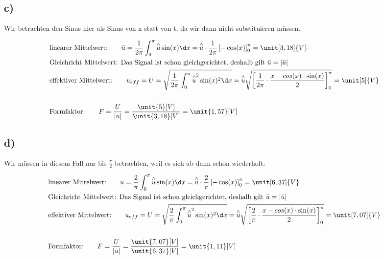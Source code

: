 \subsection*{c)}

Wir betrachten den Sinus hier als Sinus von x statt von t, da wir dann nicht substituieren müssen.

\begin{align*}
	&\text{linearer Mittelwert:} \qquad \bar{u} = \frac{1}{2 \pi} \int_0^\pi \overset{\wedge}{u} \sin(x) \d x = \overset{\wedge}{u} \cdot \frac{1}{2 \pi} \left[ - \cos(x) \right]_0^\pi = \unit[3,18]{V} \\
	&\text{Gleichricht Mittelwert: Das Signal ist schon gleichgerichtet, deshalb gilt $\bar{u} = |\bar{u}|$}  \\
	&\text{effektiver Mittelwert:} \qquad u_{eff} = U = \sqrt{ \frac{1}{2 \pi} \int_0^\pi \overset{\wedge}{u}^2\sin(x)^2 \d x} = \overset{\wedge}{u} \sqrt{\left[ \frac{1}{2 \pi} \cdot \frac{x - cos(x) \cdot \sin(x)}{2}\right]_0^\pi} = \unit[5]{V} \\
	\hfill \\
	&\text{Formfaktor:} \qquad F = \frac{U}{|u|} = \frac{\unit{5}[V]}{\unit{3,18}[V]} = \unit{1,57}[V]
\end{align*}


\newpage

\subsection*{d)}

Wir müssen in diesem Fall nur bis $\frac{\pi}{2}$ betrachten, weil es sich ab dann schon wiederholt:

\begin{align*}
	&\text{linearer Mittelwert:} \qquad \bar{u} = \frac{2}{\pi} \int_0^\pi \overset{\wedge}{u} \sin(x) \d x = \overset{\wedge}{u} \cdot \frac{2}{\pi} \left[ - \cos(x) \right]_0^\pi = \unit[6,37]{V} \\
	&\text{Gleichricht Mittelwert: Das Signal ist schon gleichgerichtet, deshalb gilt $\bar{u} = |\bar{u}|$}  \\
	&\text{effektiver Mittelwert:} \qquad u_{eff} = U = \sqrt{ \frac{2}{\pi} \int_0^\pi \overset{\wedge}{u}^2\sin(x)^2 \d x} = \overset{\wedge}{u} \sqrt{\left[ \frac{2}{\pi} \cdot \frac{x - cos(x) \cdot \sin(x)}{2}\right]_0^\pi} = \unit[7,07]{V} \\
	\hfill \\
	&\text{Formfaktor:} \qquad F = \frac{U}{|u|} = \frac{\unit{7,07}[V]}{\unit{6,37}[V]} = \unit{1,11}[V]
\end{align*}


